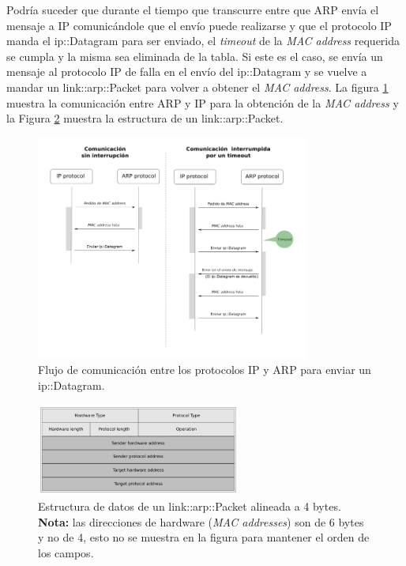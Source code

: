 \documentclass[10pt,a4paper]{article}
\begin{document}
Podría suceder que durante el tiempo que transcurre entre que ARP envía el mensaje a IP comunicándole que el envío puede realizarse y que el protocolo IP manda el ip::Datagram para ser enviado, el \textit{timeout} de la \textit{MAC address} requerida se cumpla y la misma sea eliminada de la tabla. Si este es el caso, se envía un mensaje al protocolo IP de falla en el envío del ip::Datagram y se vuelve a mandar un link::arp::Packet para volver a obtener el \textit{MAC address}. La figura \ref{figure: ARP IP comunication flow} muestra la comunicación entre ARP y IP para la obtención de la \textit{MAC address} y la Figura \ref{figure: arp packet} muestra la estructura de un link::arp::Packet.\\

\begin{figure}[!htb]
    \centering
    \includegraphics[width = 0.8\textwidth]{img/png/ip-arp-comunication.png}
    \caption{Flujo de comunicación entre los protocolos IP y ARP para enviar un ip::Datagram.}
    \label{figure: ARP IP comunication flow}
\end{figure}

\begin{figure}[!htb]
    \centering
    \includegraphics[width = 0.6\textwidth]{img/png/arp-packet.png}
    \caption{Estructura de datos de un link::arp::Packet alineada a 4 bytes. \textbf{Nota:} las direcciones de hardware (\textit{MAC addresses}) son de 6 bytes y no de 4, esto no se muestra en la figura para mantener el orden de los campos.}
    \label{figure: arp packet}
\end{figure}
\end{document}
